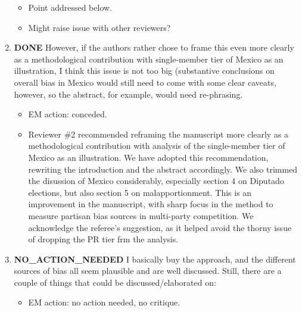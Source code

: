 \documentclass{article}
\begin{document}
\begin{enumerate}
\begin{itemize}
\item Point addressed below.
\item Might raise issue with other reviewers?
\end{itemize}
\item {\bfseries\sffamily DONE} However, if the authors rather chose to frame this even more clearly as a methodological contribution with single-member tier of Mexico as an illustration, I think this issue is not too big (substantive conclusions on overall bias in Mexico would still need to come with some clear caveats, however, so the abstract, for example, would need re-phrasing.
\label{sec:orgheadline8}
\begin{itemize}
\item EM action: conceded.
\item Reviewer \#2 recommended reframing the manuscript more clearly as a methodological contribution with analysis of the single-member tier of Mexico as an illustration. We have adopted this recommendation, rewriting the introduction and the abstract accordingly. We also trimmed the disussion of Mexico considerably, especially section 4 on Diputado elections, but also section 5 on malapportionment. This is an improvement in the manuscript, with sharp focus in the method to measure partisan bias sources in multi-party competition. We acknowledge the referee's suggestion, as it helped avoid the thorny issue of dropping the PR tier frm the analysis.
\end{itemize}
\item {\bfseries\sffamily NO\_ACTION\_NEEDED} I basically buy the approach, and the different sources of bias all seem plausible and are well discussed. Still, there are a couple of things that could be discussed/elaborated on:
\label{sec:orgheadline9}
\begin{itemize}
\item EM action: no action needed, no critique.
\end{itemize}


\end{enumerate}
\end{document}
